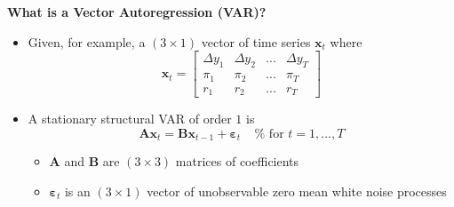 \documentclass[10pt,handout]{beamer}
\begin{document}
\begin{frame}
{\textbf{What is a Vector Autoregression (VAR)?}}

\begin{itemize}
\item Given, for example, a $(3\times 1)$ vector of time series $\mathbf{x}%
_{t}$ where%
\begin{equation*}
\mathbf{x}_{t}=\left[ 
\begin{array}{cccc}
\Delta y_{1} & \Delta y_{2} & ... & \Delta y_{T} \\ 
\pi _{1} & \pi _{2} & ... & \pi _{T} \\ 
r_{1} & r_{2} & ... & r_{T}%
\end{array}%
\right]
\end{equation*}%
\pause

\item A {{\color{red} stationary structural}} VAR of order $1$ is%
\begin{equation*}
\mathbf{Ax}_{t}=\mathbf{Bx}_{t-1}+\mathbf{\varepsilon }_{t}\ \ \ \ \ \text{%
for }t=1,...,T
\end{equation*}

\begin{itemize}
\item $\mathbf{A}$ and $\mathbf{B}$ are $(3\times 3)$ matrices of
coefficients

\item $\mathbf{\varepsilon }_{t}$ is an $(3\times 1)$ vector of unobservable
zero mean white noise processes
\end{itemize}
\end{itemize}
\end{frame}

\vspace{.1cm}
\end{document}

